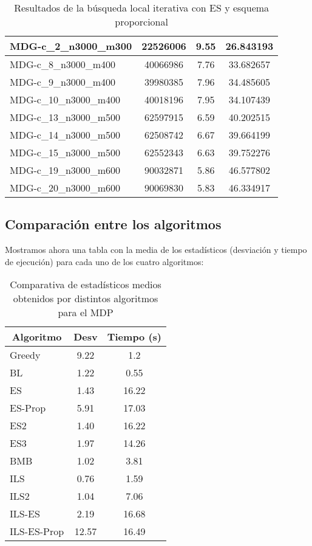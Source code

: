 \documentclass[11pt,a4paper]{article}
\begin{document}
\begin{table}[H]
\begin{center}
\begin{tabular}{|l|c|c|c|}
					MDG-c\_2\_n3000\_m300 & 22526006 & 9.55 & 26.843193 \\ \hline
					MDG-c\_8\_n3000\_m400 & 40066986 & 7.76 & 33.682657 \\ \hline
					MDG-c\_9\_n3000\_m400 & 39980385 & 7.96 & 34.485605 \\ \hline
					MDG-c\_10\_n3000\_m400 & 40018196 & 7.95 & 34.107439 \\ \hline
					MDG-c\_13\_n3000\_m500 & 62597915 & 6.59 & 40.202515 \\ \hline
					MDG-c\_14\_n3000\_m500 & 62508742 & 6.67 & 39.664199 \\ \hline
					MDG-c\_15\_n3000\_m500 & 62552343 & 6.63 & 39.752276 \\ \hline
					MDG-c\_19\_n3000\_m600 & 90032871 & 5.86 & 46.577802 \\ \hline
					MDG-c\_20\_n3000\_m600 & 90069830 & 5.83 & 46.334917 \\ \hline
				\end{tabular}
				\end{center}
				\caption{Resultados de la búsqueda local iterativa con ES y esquema proporcional}
				\label{}
			\end{table}
			


\subsection{Comparación entre los algoritmos}
Mostramos ahora una tabla con la media de los estadísticos (desviación  y tiempo de ejecución) para cada uno de los cuatro algoritmos:
\begin{table}[H]
	\begin{center}
		\begin{tabular}{|l|c|c|}
			\hline
			\multicolumn{1}{|c|}{\textbf{Algoritmo}} & \textbf{Desv} & \textbf{Tiempo (s)} \\ \hline
			Greedy & 9.22 & 1.2 \\ \hline
			BL & 1.22 & 0.55 \\ \hline
			ES & 1.43 & 16.22 \\ \hline
			ES-Prop & 5.91 & 17.03 \\ \hline
			ES2 & 1.40 & 16.22 \\ \hline
			ES3 & 1.97 & 14.26 \\ \hline
			BMB & 1.02 & 3.81 \\ \hline
			ILS & 0.76 & 1.59 \\ \hline
			ILS2 & 1.04 & 7.06 \\ \hline
			ILS-ES & 2.19 & 16.68 \\ \hline
			ILS-ES-Prop & 12.57 & 16.49 \\ \hline
		\end{tabular}
	\end{center}
	\caption{Comparativa de estadísticos medios obtenidos por distintos algoritmos para el MDP}
	\label{}
\end{table}
\end{document}
